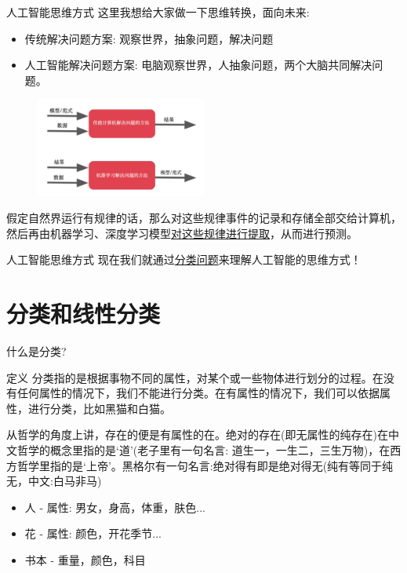 \documentclass[handout]{ctexbeamer}
\begin{document}
\begin{frame}{人工智能思维方式}
	这里我想给大家做一下思维转换，面向未来:
	\begin{itemize}
		\item 传统解决问题方案: 观察世界，抽象问题，解决问题
		\item 人工智能解决问题方案: 电脑观察世界，人抽象问题，两个大脑共同解决问题。
	\end{itemize}
	\begin{figure}[H]
		\centering
		\includegraphics[width=0.5\textwidth]{fig/C1MLbigpct}
	\end{figure}
	假定自然界运行有规律的话，那么对这些规律事件的记录和存储全部交给计算机，然后再由机器学习、深度学习模型\underline{对这些规律进行提取}，从而进行预测。
\end{frame}

\begin{frame}{人工智能思维方式}
现在我们就通过\underline{分类问题}来理解人工智能的思维方式！	
\end{frame}


\section{分类和线性分类}

\begin{frame}{什么是分类?}
	\begin{block}{定义}
	分类指的是根据事物不同的属性，对某个或一些物体进行划分的过程。在没有任何属性的情况下，我们不能进行分类。在有属性的情况下，我们可以依据属性，进行分类，比如黑猫和白猫。
\end{block}

从哲学的角度上讲，存在的便是有属性的在。绝对的存在(即无属性的纯存在)在中文哲学的概念里指的是`道’(老子里有一句名言: 道生一，一生二，三生万物)，在西方哲学里指的是`上帝'。黑格尔有一句名言:绝对得有即是绝对得无(纯有等同于纯无，中文:白马非马)
\begin{itemize}
	\item 人 - 属性: 男女，身高，体重，肤色...
	\item 花 - 属性: 颜色，开花季节...
	\item 书本 - 重量，颜色，科目
\end{itemize}
\end{frame}
\end{document}
